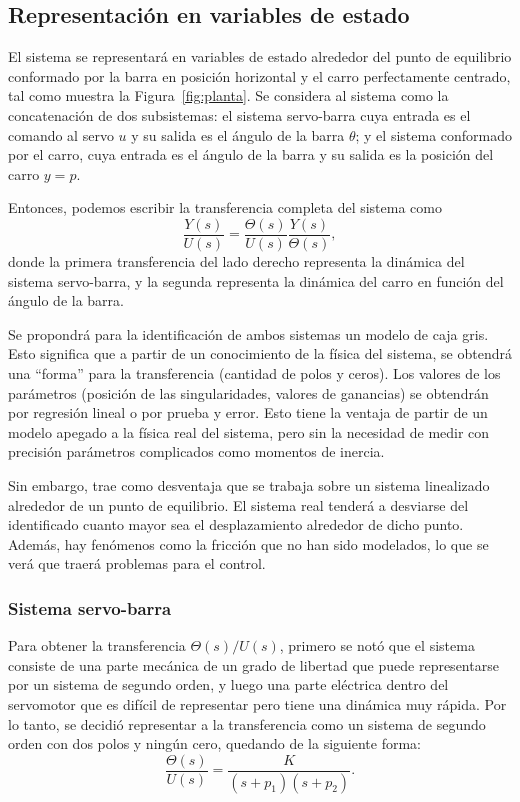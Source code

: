 \subsection{Representación en variables de estado}

El sistema se representará en variables de estado alrededor del punto de equilibrio conformado por la barra en posición horizontal y el carro perfectamente centrado, tal como muestra la Figura~\ref{fig:planta}. Se considera al sistema como la concatenación de dos subsistemas: el sistema servo-barra cuya entrada es el comando al servo $u$ y su salida es el ángulo de la barra $\theta$; y el sistema conformado por el carro, cuya entrada es el ángulo de la barra y su salida es la posición del carro $y = p$.

Entonces, podemos escribir la transferencia completa del sistema como
\[
    \frac{Y(s)}{U(s)} = \frac{\Theta(s)}{U(s)} \frac{Y(s)}{\Theta(s)},
\]
donde la primera transferencia del lado derecho representa la dinámica del sistema servo-barra, y la segunda representa la dinámica del carro en función del ángulo de la barra.

Se propondrá para la identificación de ambos sistemas un modelo de caja gris. Esto significa que a partir de un conocimiento de la física del sistema, se obtendrá una ``forma'' para la transferencia (cantidad de polos y ceros). Los valores de los parámetros (posición de las singularidades, valores de ganancias) se obtendrán por regresión lineal o por prueba y error. Esto tiene la ventaja de partir de un modelo apegado a la física real del sistema, pero sin la necesidad de medir con precisión parámetros complicados como momentos de inercia.

Sin embargo, trae como desventaja que se trabaja sobre un sistema linealizado alrededor de un punto de equilibrio. El sistema real tenderá a desviarse del identificado cuanto mayor sea el desplazamiento alrededor de dicho punto. Además, hay fenómenos como la fricción que no han sido modelados, lo que se verá que traerá problemas para el control.

\subsubsection{Sistema servo-barra}

Para obtener la transferencia $\Theta(s) / U(s)$, primero se notó que el sistema consiste de una parte mecánica de un grado de libertad que puede representarse por un sistema de segundo orden, y luego una parte eléctrica dentro del servomotor que es difícil de representar pero tiene una dinámica muy rápida. Por lo tanto, se decidió representar a la transferencia como un sistema de segundo orden con dos polos y ningún cero, quedando de la siguiente forma:
\[
    \frac{\Theta(s)}{U(s)} = \frac{K}{(s+p_1)(s+p_2)}.
\]

